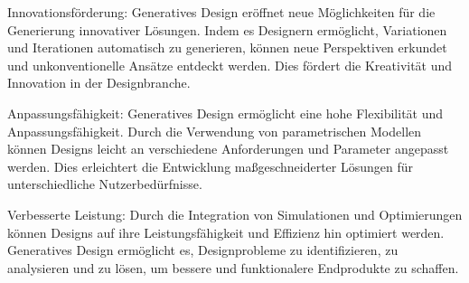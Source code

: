 Innovationsförderung: Generatives Design eröffnet neue Möglichkeiten für die Generierung innovativer Lösungen. Indem es Designern ermöglicht, Variationen und Iterationen automatisch zu generieren, können neue Perspektiven erkundet und unkonventionelle Ansätze entdeckt werden. Dies fördert die Kreativität und Innovation in der Designbranche.

Anpassungsfähigkeit: Generatives Design ermöglicht eine hohe Flexibilität und Anpassungsfähigkeit. Durch die Verwendung von parametrischen Modellen können Designs leicht an verschiedene Anforderungen und Parameter angepasst werden. Dies erleichtert die Entwicklung maßgeschneiderter Lösungen für unterschiedliche Nutzerbedürfnisse.

Verbesserte Leistung: Durch die Integration von Simulationen und Optimierungen können Designs auf ihre Leistungsfähigkeit und Effizienz hin optimiert werden. Generatives Design ermöglicht es, Designprobleme zu identifizieren, zu analysieren und zu lösen, um bessere und funktionalere Endprodukte zu schaffen.
